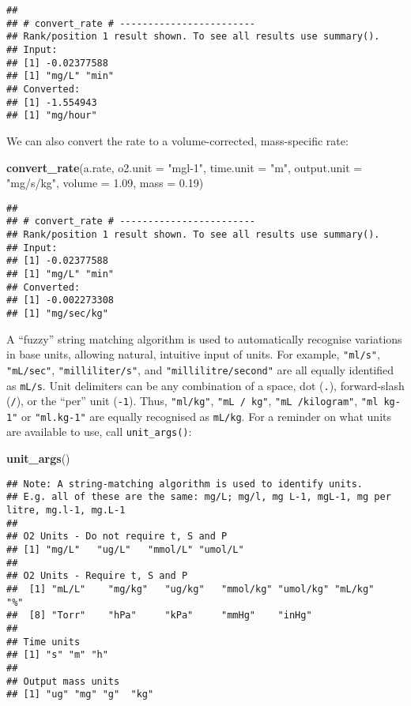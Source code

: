 \documentclass[]{book}
\newenvironment{Shaded}{\begin{snugshade}}{\end{snugshade}}
\newcommand{\KeywordTok}[1]{\textcolor[rgb]{0.13,0.29,0.53}{\textbf{#1}}}
\newcommand{\DataTypeTok}[1]{\textcolor[rgb]{0.13,0.29,0.53}{#1}}
\newcommand{\FloatTok}[1]{\textcolor[rgb]{0.00,0.00,0.81}{#1}}
\newcommand{\StringTok}[1]{\textcolor[rgb]{0.31,0.60,0.02}{#1}}
\newcommand{\NormalTok}[1]{#1}
\begin{document}
\begin{verbatim}
## 
## # convert_rate # ------------------------
## Rank/position 1 result shown. To see all results use summary().
## Input:
## [1] -0.02377588
## [1] "mg/L" "min" 
## Converted:
## [1] -1.554943
## [1] "mg/hour"
\end{verbatim}

We can also convert the rate to a volume-corrected, mass-specific rate:

\begin{Shaded}
\begin{Highlighting}[]
\KeywordTok{convert_rate}\NormalTok{(a.rate, }
             \DataTypeTok{o2.unit =} \StringTok{"mgl-1"}\NormalTok{, }
             \DataTypeTok{time.unit =} \StringTok{"m"}\NormalTok{, }
             \DataTypeTok{output.unit =} \StringTok{"mg/s/kg"}\NormalTok{,}
             \DataTypeTok{volume =} \FloatTok{1.09}\NormalTok{, }
             \DataTypeTok{mass =} \FloatTok{0.19}\NormalTok{)}
\end{Highlighting}
\end{Shaded}

\begin{verbatim}
## 
## # convert_rate # ------------------------
## Rank/position 1 result shown. To see all results use summary().
## Input:
## [1] -0.02377588
## [1] "mg/L" "min" 
## Converted:
## [1] -0.002273308
## [1] "mg/sec/kg"
\end{verbatim}

A ``fuzzy'' string matching algorithm is used to automatically recognise
variations in base units, allowing natural, intuitive input of units.
For example, \texttt{"ml/s"}, \texttt{"mL/sec"},
\texttt{"milliliter/s"}, and \texttt{"millilitre/second"} are all
equally identified as \texttt{mL/s}. Unit delimiters can be any
combination of a space, dot (\texttt{.}), forward-slash (\texttt{/}), or
the ``per'' unit (\texttt{-1}). Thus, \texttt{"ml/kg"},
\texttt{"mL\ /\ kg"}, \texttt{"mL\ /kilogram"}, \texttt{"ml\ kg-1"} or
\texttt{"ml.kg-1"} are equally recognised as \texttt{mL/kg}. For a
reminder on what units are available to use, call \texttt{unit\_args()}:

\begin{Shaded}
\begin{Highlighting}[]
\KeywordTok{unit_args}\NormalTok{()}
\end{Highlighting}
\end{Shaded}

\begin{verbatim}
## Note: A string-matching algorithm is used to identify units. 
## E.g. all of these are the same: mg/L; mg/l, mg L-1, mgL-1, mg per litre, mg.l-1, mg.L-1
## 
## O2 Units - Do not require t, S and P
## [1] "mg/L"   "ug/L"   "mmol/L" "umol/L"
## 
## O2 Units - Require t, S and P
##  [1] "mL/L"    "mg/kg"   "ug/kg"   "mmol/kg" "umol/kg" "mL/kg"   "%"      
##  [8] "Torr"    "hPa"     "kPa"     "mmHg"    "inHg"   
## 
## Time units
## [1] "s" "m" "h"
## 
## Output mass units
## [1] "ug" "mg" "g"  "kg"
\end{verbatim}
\end{document}
